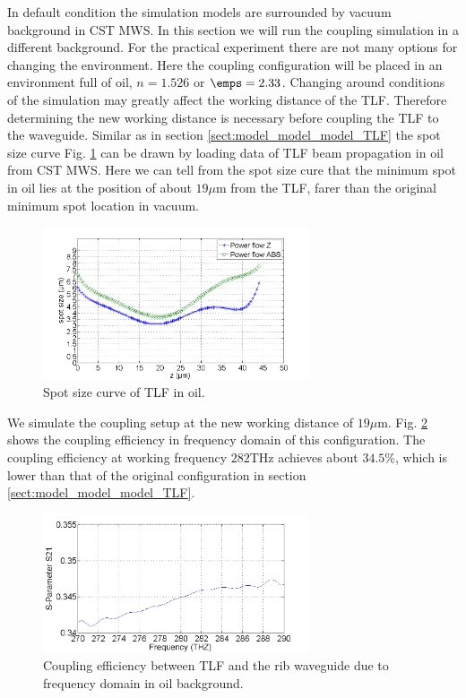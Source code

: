 In default condition the simulation models are surrounded by vacuum background in CST MWS.
In this section we will run the coupling simulation in a different background. For the practical experiment there are not many options for changing the environment. Here the coupling configuration will be placed in an environment full of oil, $n=1.526$ or $\emps=2.33$. Changing around conditions of the simulation may greatly affect the working distance of the TLF. Therefore determining the new working distance is necessary before coupling the TLF to the waveguide.  Similar as in section \ref{sect:model_model_model_TLF} the spot size curve Fig. \ref{fig:oil_spot_curve} can be drawn by loading data of TLF beam propagation in oil from CST MWS. Here we can tell from the spot size cure that the minimum spot in oil lies at the position of about $19\mu$m from the TLF, farer than the original minimum spot location in vacuum.\\    
\begin{figure}[!ht]
\centering
\includegraphics[width=0.7\textwidth]{bilder/spot_curve_oil}
\caption{Spot size curve of TLF in oil.}
\label{fig:oil_spot_curve}
\end{figure}
We simulate the coupling setup at the new working distance of $19\mu$m. Fig. \ref{fig:oil_coupling_curve} shows the coupling efficiency in frequency domain of this configuration. The coupling efficiency at working frequency $282$THz achieves about $34.5\%$, which is lower than that of the original configuration in section \ref{sect:model_model_model_TLF}.
\begin{figure}[!ht]
\centering
\includegraphics[width=0.7\textwidth]{bilder/s21_oil_curve}
\caption{Coupling efficiency between TLF and the rib waveguide due to frequency domain in oil background.}
\label{fig:oil_coupling_curve}
\end{figure}
